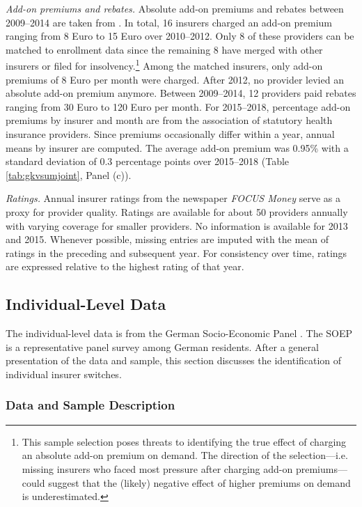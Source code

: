 \documentclass[a4paper, 11pt, english]{article}
\begin{document}
\textit{Add-on premiums and rebates.} Absolute add-on premiums and rebates between 2009--2014 are taken from \citet{Pendzialek2015}. In total, 16 insurers charged an add-on premium ranging from 8 Euro to 15 Euro over 2010--2012. Only 8 of these providers can be matched to enrollment data since the remaining 8 have merged with other insurers or filed for insolvency.\footnote{This sample selection poses threats to identifying the true effect of charging an absolute add-on premium on demand. The direction of the selection---i.e. missing insurers who faced most pressure after charging add-on premiums---could suggest that the (likely) negative effect of higher premiums on demand is underestimated.} Among the matched insurers, only add-on premiums of 8 Euro per month were charged. After 2012, no provider levied an absolute add-on premium anymore. Between 2009--2014, 12 providers paid rebates ranging from 30 Euro to 120 Euro per month. For 2015--2018, percentage add-on premiums by insurer and month are from the association of statutory health insurance providers. Since premiums occasionally differ within a year, annual means by insurer are computed. The average add-on premium was 0.95\% with a standard deviation of 0.3 percentage points over 2015--2018 (Table \ref{tab:gkvsumjoint}, Panel (c)).

\textit{Ratings.} Annual insurer ratings from the newspaper \textit{FOCUS Money} serve as a proxy for provider quality. Ratings are available for about 50 providers annually with varying coverage for smaller providers. No information is available for 2013 and 2015. Whenever possible, missing entries are imputed with the mean of ratings in the preceding and subsequent year. For consistency over time, ratings are expressed relative to the highest rating of that year.

\subsection{Individual-Level Data \label{subsec:dataindividual}}

The individual-level data is from the German Socio-Economic Panel \citep{soep2020}. The SOEP is a representative panel survey among German residents. After a general presentation of the data and sample, this section discusses the identification of individual insurer switches.

\subsubsection*{Data and Sample Description \label{subsubsec:soep}}
\end{document}
